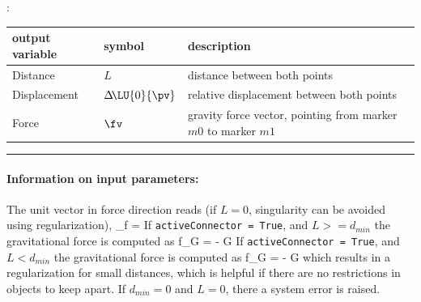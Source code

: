 :
\begin{center}
\footnotesize
\begin{longtable}{| p{5cm} | p{5cm} | p{6cm} |} 
\hline
\bf output variable & \bf symbol & \bf description \\ \hline
Distance & $L$ & distance between both points\\ \hline
Displacement & $\Delta\! \LU{0}{\pv}$ & relative displacement between both points\\ \hline
Force & $\fv$ & gravity force vector, pointing from marker $m0$ to marker $m1$\\ \hline
\end{longtable}
\end{center}
\par\noindent\rule{\textwidth}{0.4pt}
\label{description_ObjectConnectorGravity}
\paragraph{Information on input parameters:} 
\finishTable
 \noindent
    \finishTable
    \finishTable
%
    The unit vector in force direction reads (if $L=0$, singularity can be avoided using regularization),
    \be
      \vv_{f} =  \Delta\! 
    \ee
    If \texttt{activeConnector = True}, and $L>=d_{min}$ the gravitational force is computed as
    \be
      f_G = - G 
    \ee
    If \texttt{activeConnector = True}, and $L<d_{min}$ the gravitational force is computed as
    \be
      f_G = - G 
    \ee
    which results in a regularization for small distances, which is helpful if there are no restrictions in objects to keep apart.
    If $d_{min}=0$ and $L=0$, there a system error is raised.
    
